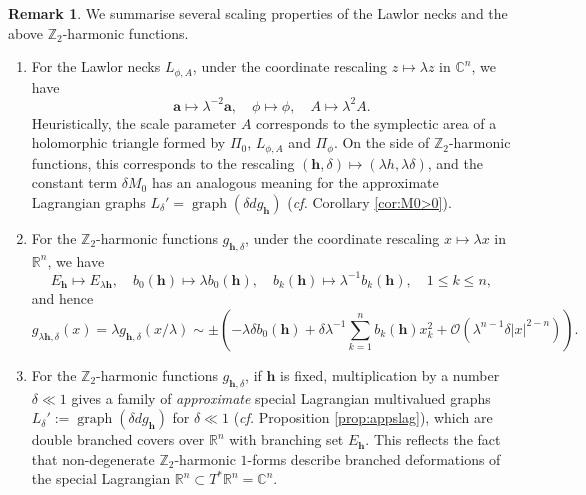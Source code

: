 \documentclass[11pt,a4paper]{article}
\numberwithin{equation}{section}%
\theoremstyle{definition}
\newtheorem{rmk}[thm]{Remark}
\newcommand{\cf}{\emph{cf.} }
\newcommand{\R}{\mathbb{R}}
\newcommand{\bmh}{\boldsymbol{h}}
\newcommand{\bma}{\boldsymbol{a}}
\newcommand{\C}{\mathbb{C}}
\newcommand{\Z}{\mathbb{Z}}
\begin{document}
\begin{rmk}\label{rmk:scaling}
We summarise several scaling properties of the Lawlor necks and the above $\Z_2$-harmonic functions. 
    \begin{enumerate}
        \item[\textnormal{(1)}] For the Lawlor necks $L_{\phi,A}$, under the coordinate rescaling $z\mapsto \lambda z$ in $\C^n$, we have
        \[
            \bma \mapsto \lambda^{-2}\bma,
            \quad
            \phi\mapsto \phi,
            \quad
            A\mapsto \lambda^2A.
        \]
        Heuristically, the scale parameter $A$ corresponds to the symplectic area of a holomorphic triangle formed by $\Pi_0$, $L_{\phi,A}$ and $\Pi_\phi$.
        On the side of $\Z_2$-harmonic functions, this corresponds to the rescaling $(\bmh,\delta)\mapsto (\lambda h,\lambda \delta)$, and the constant term $\delta M_0$ has an analogous meaning for the approximate Lagrangian graphs $L_\delta'=\operatorname{graph}(\delta dg_{\bmh})$ (\cf Corollary \ref{cor:M0>0}).  
        
        \item[\textnormal{(2)}] For the $\Z_2$-harmonic functions $g_{\bmh,\delta}$, under the coordinate rescaling $x\mapsto \lambda x$ in $\R^n$, we have
        \[
            E_{\bmh}\mapsto E_{\lambda\bmh},
            \quad
            b_0(\bmh)\mapsto \lambda b_0(\bmh),
            \quad
            b_k(\bmh)\mapsto \lambda^{-1}b_k(\bmh),
            \quad
            1\leqslant k\leqslant n,
        \]
        and hence
        \[
            g_{\lambda \bmh,\delta}(x)
            =
            \lambda g_{\bmh,\delta}(x/\lambda)
            \sim
            \pm\left(
            -\lambda\delta b_0(\bmh)
            +
            \delta\lambda^{-1}\sum_{k=1}^{n}b_k(\bmh)x_k^2
            +
            \mathcal{O}(\lambda^{n-1}\delta |x|^{2-n})
            \right).
        \]

        \item[\textnormal{(3)}] For the $\Z_2$-harmonic functions $g_{\bmh,\delta}$, if $\bmh$ is fixed, multiplication by a number $\delta\ll 1$ gives a family of \textit{approximate} special Lagrangian multivalued graphs
        $L_{\delta}':=\operatorname{graph}(\delta dg_{\bmh})$
        for $\delta \ll 1$ (\cf Proposition \ref{prop:appslag}), which are double branched covers over $\R^n$ with branching set $E_{\bmh}$. This reflects the fact that non-degenerate $\mathbb Z_2$-harmonic $1$-forms describe branched deformations of the special Lagrangian $\R^n\subset T^*\R^n=\C^n$.
    

\end{enumerate}
\end{rmk}
\end{document}
